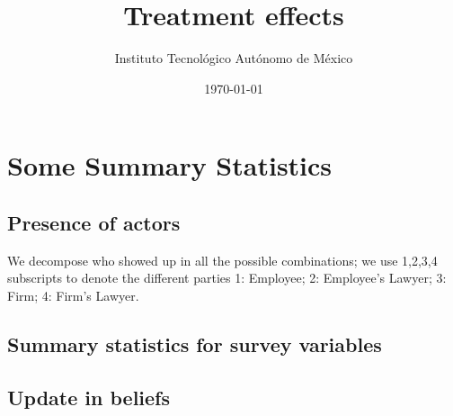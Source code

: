 \documentclass[12pt]{article}
\theoremstyle{named}
\newcommand{\folder}{C:/Users/chasi_000/Dropbox/Statistics/P10/Results/Results_2/Effect}
\begin{document}
\title{Treatment effects}

\author{Instituto Tecnológico Autónomo de México}
\date{\today}
\maketitle


\hrulefill


\section{\Huge{Some Summary Statistics}}

\vspace{7mm}

\subsection*{Presence of actors}


\begin{center}
\scriptsize{}
\end{center}

We decompose who showed up in all the possible combinations; we use 1,2,3,4 subscripts to denote the different parties 1: Employee; 2: Employee’s Lawyer;  3: Firm; 4: Firm’s Lawyer. 


\begin{center}
\scriptsize{}
\end{center}

\pagebreak

\subsection*{Summary statistics for survey variables}

\begin{center}
\scriptsize{}
\end{center}


\begin{center}
\scriptsize{}
\end{center}


\begin{center}
\scriptsize{}
\end{center}


\pagebreak

\subsection*{Update in beliefs}
\end{document}
